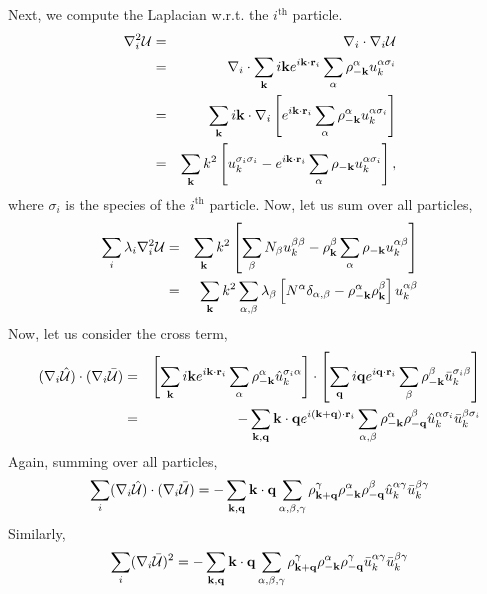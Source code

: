 \documentclass{article}
\begin{document}
Next, we compute the Laplacian w.r.t. the $i^{\text{th}}$ particle.
\begin{eqnarray}
\nabla^2_i \mathcal{U} & = & \nabla_i \cdot \nabla_i \mathcal{U} \\
& = & \nabla_i \cdot \sum_{\mathbf{k}} i\mathbf{k} e^{i\mathbf{k} \cdot \mathbf{r}_i} \sum_\alpha
\rho_{-\mathbf{k}}^\alpha u^{\alpha \sigma_i}_k \\
& = & \sum_{\mathbf{k}} i\mathbf{k} \cdot \nabla_i \left[ e^{i\mathbf{k} \cdot \mathbf{r}_i}
  \sum_\alpha \rho_{-\mathbf{k}}^\alpha u^{\alpha\sigma_i}_k \right] \\
& = & \sum_{\mathbf{k}} k^2 \left[ u^{\sigma_i \sigma_i}_k - e^{i\mathbf{k}\cdot\mathbf{r}_i}\sum_\alpha \rho_{-\mathbf{k}}
u_k^{\alpha \sigma_i}\right],
\end{eqnarray}
where $\sigma_i$ is the species of the $i^{\text{th}}$ particle.  Now,
let us sum over all particles,
\begin{eqnarray}
\sum_i \lambda_i \nabla^2_i \mathcal{U} & = & \sum_{\mathbf{k}} k^2 \left[\sum_\beta N_\beta u_k^{\beta
  \beta} - \rho_{\mathbf{k}}^\beta \sum_\alpha \rho_{-\mathbf{k}} u_k^{\alpha \beta}
  \right] \\
& = & \sum_{\mathbf{k}} k^2 \sum_{\alpha, \beta}
  \lambda_\beta \left[N^{\alpha}\delta_{\alpha,\beta} -
  \rho_{-\mathbf{k}}^{\alpha}\rho_{\mathbf{k}}^\beta \right]u_k^{\alpha \beta} 
\end{eqnarray}
Now, let us consider the cross term,
\begin{eqnarray}
(\nabla_i \hat{\mathcal{U}}) \cdot ( \nabla_i \bar{\mathcal{U}} ) 
& = & \left[\sum_{\mathbf{k}} i\mathbf{k} e^{i\mathbf{k}\cdot \mathbf{r}_i} \sum_\alpha
  \rho_{-\mathbf{k}}^\alpha \hat{u}^{\sigma_i \alpha}_k \right] \cdot
\left[\sum_{\mathbf{q}} i\mathbf{q} e^{i\mathbf{q}\cdot \mathbf{r}_i} \sum_\beta
  \rho_{-\mathbf{k}}^\beta \bar{u}^{\sigma_i \beta}_k \right] \nonumber \\
& = & -\sum_{\mathbf{k},\mathbf{q}} \mathbf{k} \cdot \mathbf{q} e^{i(\mathbf{k} + \mathbf{q})\cdot \mathbf{r}_i}
\sum_{\alpha, \beta} \rho_{-\mathbf{k}}^\alpha \rho_{-\mathbf{q}}^\beta 
\hat{u}^{\alpha \sigma_i}_k \bar{u}^{\beta \sigma_i}_k
\end{eqnarray}
Again, summing over all particles,
\begin{equation}
\sum_i (\nabla_i \hat{\mathcal{U}}) \cdot ( \nabla_i \bar{\mathcal{U}} ) =
-\sum_{\mathbf{k}, \mathbf{q}} \mathbf{k} \cdot \mathbf{q} \sum_{\alpha, \beta, \gamma}
\rho_{\mathbf{k} + \mathbf{q}}^\gamma \rho_{-\mathbf{k}}^{\alpha} \rho_{-\mathbf{q}}^\beta
\hat{u}^{\alpha \gamma}_k \bar{u}^{\beta \gamma}_k
\end{equation}
Similarly,
\begin{equation}
\sum_i (\nabla_i \bar{\mathcal{U}})^2 = -\sum_{\mathbf{k}, \mathbf{q}} \mathbf{k} \cdot \mathbf{q} 
\sum_{\alpha, \beta, \gamma} \rho^\gamma_{\mathbf{k}+\mathbf{q}} \rho^\alpha_{-\mathbf{k}}
\rho^\gamma_{-\mathbf{q}} \bar{u}^{\alpha \gamma}_k \bar{u}^{\beta \gamma}_k
\end{equation}
\end{document}
